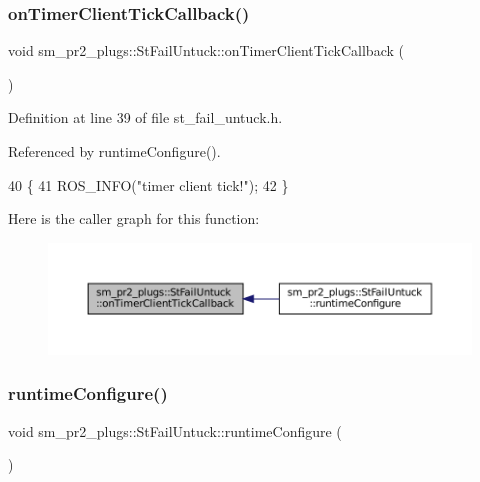 \subsubsection{\texorpdfstring{on\+Timer\+Client\+Tick\+Callback()}{onTimerClientTickCallback()}}
{\footnotesize\ttfamily void sm\+\_\+pr2\+\_\+plugs\+::\+St\+Fail\+Untuck\+::on\+Timer\+Client\+Tick\+Callback (\begin{DoxyParamCaption}{ }\end{DoxyParamCaption})\hspace{0.3cm}{\ttfamily [inline]}}



Definition at line 39 of file st\+\_\+fail\+\_\+untuck.\+h.



Referenced by runtime\+Configure().


\begin{DoxyCode}
40     \{
41         ROS\_INFO(\textcolor{stringliteral}{"timer client tick!"});
42     \}
\end{DoxyCode}
Here is the caller graph for this function\+:
\nopagebreak
\begin{figure}[H]
\begin{center}
\leavevmode
\includegraphics[width=350pt]{structsm__pr2__plugs_1_1StFailUntuck_a8b5c97b9980e1e8013f78a1e452621e9_icgraph}
\end{center}
\end{figure}
\mbox{\label{structsm__pr2__plugs_1_1StFailUntuck_af2e650b9c6962deb4740dd3e085a9978}} 
\subsubsection{\texorpdfstring{runtime\+Configure()}{runtimeConfigure()}}
{\footnotesize\ttfamily void sm\+\_\+pr2\+\_\+plugs\+::\+St\+Fail\+Untuck\+::runtime\+Configure (\begin{DoxyParamCaption}{ }\end{DoxyParamCaption})\hspace{0.3cm}{\ttfamily [inline]}}



